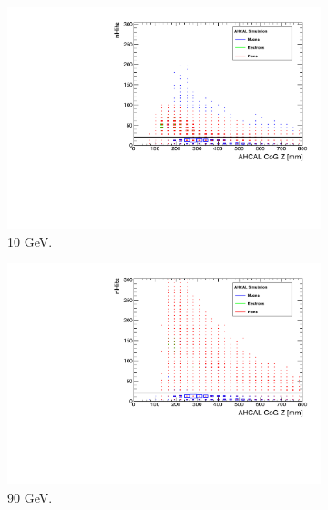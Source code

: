 \begin{figure}[htbp!]
\begin{subfigure}[t]{0.5\textwidth}
		\includegraphics[width=1\linewidth]{chap5/fig_AHCAL_timing/Pions/SelectionCut_nHitsCoGZ_10GeV}
		\caption{10 GeV.} \label{fig:pi10GeV_nHitsCoGZ}
	\end{subfigure}
	\hfill
	\begin{subfigure}[t]{0.5\textwidth}
		\centering
		\includegraphics[width=1\linewidth]{chap5/fig_AHCAL_timing/Pions/SelectionCut_nHitsCoGZ_90GeV}
		\caption{90 GeV.} \label{fig:pi90GeV_nHitsCoGZ}
	\end{subfigure}
	\hfill
	\begin{subfigure}[t]{0.5\textwidth}
		\centering

\end{subfigure}
\end{figure}
